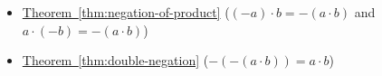 \begin{dependencies}
\begin{itemize}
  \item \hyperref[thm:negation-of-product]{Theorem~\ref*{thm:negation-of-product}}
        \textnormal{($(-a)\cdot b = -(a\cdot b)$ and $a\cdot(-b) = -(a\cdot b)$)}
  \item \hyperref[thm:double-negation]{Theorem~\ref*{thm:double-negation}}
        \textnormal{($-(-(a\cdot b)) = a\cdot b$)}
\end{itemize}
\end{dependencies}

\clearpage
